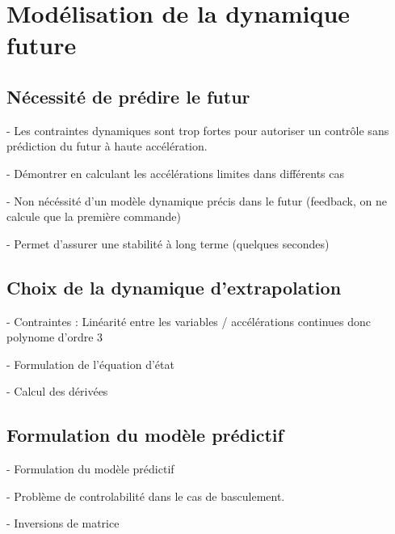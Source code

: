 	\section{Modélisation de la dynamique future}
		\subsection{Nécessité de prédire le futur}

			- Les contraintes dynamiques sont trop fortes pour autoriser un contrôle sans prédiction du futur à haute accélération.

			- Démontrer en calculant les accélérations limites dans différents cas

			- Non nécéssité d'un modèle dynamique précis dans le futur (feedback, on ne calcule que la première commande)

			- Permet d'assurer une stabilité à long terme (quelques secondes)
		\subsection{Choix de la dynamique d'extrapolation}

			- Contraintes : Linéarité entre les variables / accélérations continues donc polynome d'ordre 3

			- Formulation de l'équation d'état

			- Calcul des dérivées

		\subsection{Formulation du modèle prédictif}

			- Formulation du modèle prédictif

			- Problème de controlabilité dans le cas de basculement.
			
			- Inversions de matrice